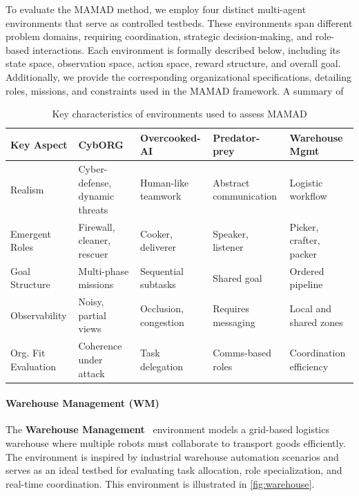 \documentclass[pdflatex,sn-mathphys-num]{sn-jnl}%
\theoremstyle{thmstyleone}%
\theoremstyle{thmstyletwo}%
\theoremstyle{thmstylethree}%
\begin{document}
To evaluate the MAMAD method, we employ four distinct multi-agent environments that serve as controlled testbeds. These environments span different problem domains, requiring coordination, strategic decision-making, and role-based interactions. Each environment is formally described below, including its state space, observation space, action space, reward structure, and overall goal. Additionally, we provide the corresponding organizational specifications, detailing roles, missions, and constraints used in the MAMAD framework. A summary of 

\begin{table}[h!]
    \centering
    \begin{footnotesize}
        \renewcommand{\arraystretch}{1.3}
        \begin{tabular}{p{2cm}p{2.2cm}p{2.2cm}p{2.2cm}p{2.2cm}}
            \hline
            \textbf{Key Aspect} & \textbf{CybORG}                & \textbf{Overcooked-AI} & \textbf{Predator-prey} & \textbf{Warehouse Mgmt} \\ \hline
            Realism             & Cyber-defense, dynamic threats & Human-like teamwork    & Abstract communication & Logistic workflow       \\ \hline
            Emergent Roles      & Firewall, cleaner, rescuer     & Cooker, deliverer      & Speaker, listener      & Picker, crafter, packer \\ \hline
            Goal Structure      & Multi-phase missions           & Sequential subtasks    & Shared goal       & Ordered pipeline        \\ \hline
            Observability       & Noisy, partial views           & Occlusion, congestion  & Requires messaging     & Local and shared zones  \\ \hline
            Org. Fit Evaluation & Coherence under attack         & Task delegation        & Comms-based roles      & Coordination efficiency \\ \hline
        \end{tabular}
        \caption{Key characteristics of environments used to assess MAMAD}
        \label{tab:mamad_env_characteristics}
    \end{footnotesize}
\end{table}


\paragraph{Warehouse Management (WM)}
The \textbf{Warehouse Management}~\cite{warehouse_management} environment models a grid-based logistics warehouse where multiple robots must collaborate to transport goods efficiently. The environment is inspired by industrial warehouse automation scenarios and serves as an ideal testbed for evaluating task allocation, role specialization, and real-time coordination. This environment is illustrated in \autoref{fig:warehouse}.
\end{document}
